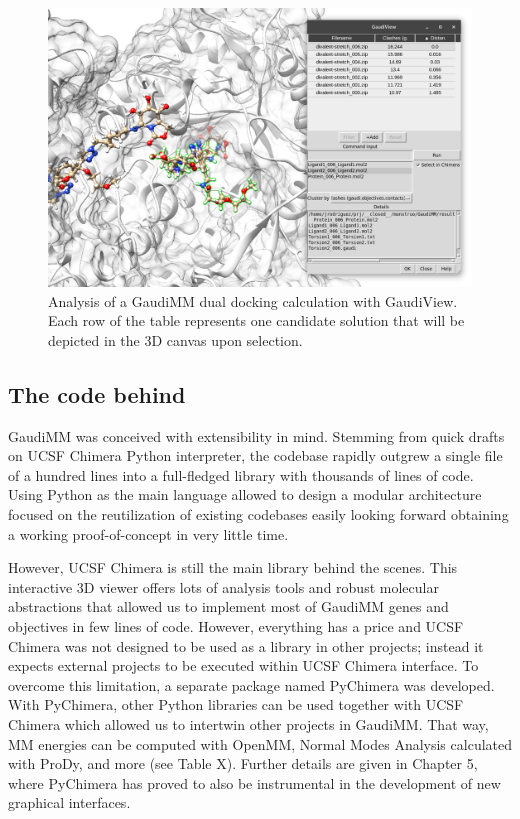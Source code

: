 \begin{figure}[H]
	\includegraphics[width=\textwidth]{./figures/04/gaudiview.png}
	\caption[GaudiView]{Analysis of a GaudiMM dual docking calculation with GaudiView. Each row of the table represents one candidate solution that will be depicted in the 3D canvas upon selection.}
	\label{fig:gaudiview}
\end{figure}


\subsection{The code behind}
GaudiMM was conceived with extensibility in mind. Stemming from quick drafts on UCSF Chimera Python interpreter, the codebase rapidly outgrew a single file of a hundred lines into a full-fledged library with thousands of lines of code. Using Python as the main language allowed to design a modular architecture focused on the reutilization of existing codebases easily looking forward obtaining a working proof-of-concept in very little time.

However, UCSF Chimera is still the main library behind the scenes. This interactive 3D viewer offers lots of analysis tools and robust molecular abstractions that allowed us to implement most of GaudiMM genes and objectives in few lines of code. However, everything has a price and UCSF Chimera was not designed to be used as a library in other projects; instead it expects external projects to be executed within UCSF Chimera interface. To overcome this limitation, a separate package named PyChimera was developed. With PyChimera, other Python libraries can be used together with UCSF Chimera which allowed us to intertwin other projects in GaudiMM. That way, MM energies can be computed with OpenMM, Normal Modes Analysis calculated with ProDy, and more (see Table X). Further details are given in Chapter 5, where PyChimera has proved to also be instrumental in the development of new graphical interfaces.

